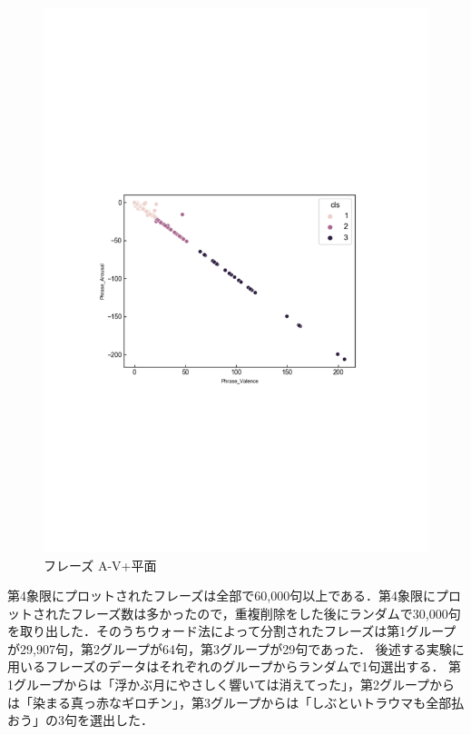 \begin{figure}[H]
    \centering
    \includegraphics[width=14cm]{phrase_A-V+.pdf}
    \vspace{-1mm}
    \caption{フレーズ A-V+平面}
    \label{fig:mms}
    \vspace{5mm}
\end{figure}
第4象限にプロットされたフレーズは全部で60,000句以上である．第4象限にプロットされたフレーズ数は多かったので，重複削除をした後にランダムで30,000句を取り出した．そのうちウォード法によって分割されたフレーズは第1グループが29,907句，第2グループが64句，第3グループが29句であった．
後述する実験に用いるフレーズのデータはそれぞれのグループからランダムで1句選出する．
第1グループからは「浮かぶ月にやさしく響いては消えてった」，第2グループからは「染まる真っ赤なギロチン」，第3グループからは「しぶといトラウマも全部払おう」の3句を選出した．
